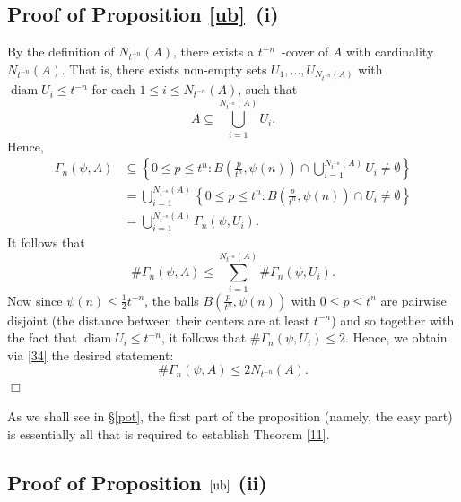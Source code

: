 \documentclass[12pt]{article}
\theoremstyle{definition}
\theoremstyle{remark}
\DeclareMathOperator{\diam}{diam}
\begin{document}
\subsection{Proof of Proposition \ref{ub}~(i)}
 By the definition of $N_{t^{-n}}(A)$, there exists a $t^{-n}$~-cover of $A$ with cardinality $N_{t^{-n}}(A)$. That is, there exists non-empty sets
$U_{1},\ldots,U_{N_{t^{-n}}(A)}$ with $\diam U_{i}\leq t^{-n}$ for each $1\leq i\leq N_{t^{-n}}(A)$, such that
$$A\subseteq\bigcup_{i=1}^{N_{t^{-n}}(A)}U_{i}.$$
Hence,
\begin{equation*}
\begin{aligned}
\Gamma_n(\psi,A) &\subseteq\left\{0\leq p\leq t^{n}: B\left(\frac{p}{t^{n}},\psi(n)\right)\cap\bigcup_{i=1}^{N_{t^{-n}}(A)}U_{i}\neq\emptyset\right\} \\[2ex]
&=\bigcup_{i=1}^{N_{t^{-n}}(A)}\left\{0\leq p\leq t^{n}: B\left(\frac{p}{t^{n}},\psi(n)\right)\cap U_{i}\neq\emptyset\right\} \\[2ex]
&=\bigcup_{i=1}^{N_{t^{-n}}(A)}\Gamma_n(\psi,U_{i}).
\end{aligned}
\end{equation*}
It follows that
\begin{equation}\label{34}
\#\Gamma_n(\psi,A) \leq\sum_{i=1}^{N_{t^{-n}}(A)}\#\Gamma_n(\psi,U_{i}).
\end{equation}
Now since $\psi(n)\leq\frac{1}{2}t^{-n}$, the balls $B\left(\frac{p}{t^{n}},\psi(n)\right)$  with $0\leq p\leq t^{n}$ are pairwise disjoint (the distance between their centers are at least $t^{-n}$) and so together with the fact that $\diam U_{i}\leq t^{-n}$, it follows that   $\#\Gamma_n(\psi,U_{i})\leq2$.   
Hence, we obtain via \eqref{34}   the desired statement:
$$\#\Gamma_n(\psi,A) \leq2N_{t^{-n}}(A). $$
\hfill $\Box$

\medskip 

As we shall see in 
\S\ref{pot}, the first part of the proposition (namely, the easy part) is essentially all that is required to establish Theorem \ref{11}.



\subsection{Proof of Proposition $\ref{ub}$ (ii)}
\end{document}

